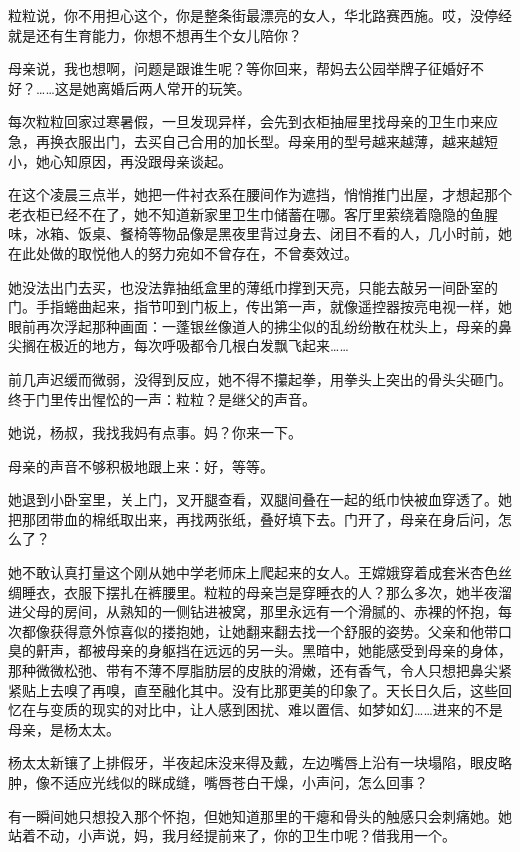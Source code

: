 \documentclass[lang=cn,newtx,12pt,scheme=chinese]{elegantbook}
\begin{document}
粒粒说，你不用担心这个，你是整条街最漂亮的女人，华北路赛西施。哎，没停经就是还有生育能力，你想不想再生个女儿陪你？

母亲说，我也想啊，问题是跟谁生呢？等你回来，帮妈去公园举牌子征婚好不好？……这是她离婚后两人常开的玩笑。

每次粒粒回家过寒暑假，一旦发现异样，会先到衣柜抽屉里找母亲的卫生巾来应急，再换衣服出门，去买自己合用的加长型。母亲用的型号越来越薄，越来越短小，她心知原因，再没跟母亲谈起。

在这个凌晨三点半，她把一件衬衣系在腰间作为遮挡，悄悄推门出屋，才想起那个老衣柜已经不在了，她不知道新家里卫生巾储蓄在哪。客厅里萦绕着隐隐的鱼腥味，冰箱、饭桌、餐椅等物品像是黑夜里背过身去、闭目不看的人，几小时前，她在此处做的取悦他人的努力宛如不曾存在，不曾奏效过。

她没法出门去买，也没法靠抽纸盒里的薄纸巾撑到天亮，只能去敲另一间卧室的门。手指蜷曲起来，指节叩到门板上，传出第一声，就像遥控器按亮电视一样，她眼前再次浮起那种画面：一蓬银丝像道人的拂尘似的乱纷纷散在枕头上，母亲的鼻尖搁在极近的地方，每次呼吸都令几根白发飘飞起来……

前几声迟缓而微弱，没得到反应，她不得不攥起拳，用拳头上突出的骨头尖砸门。终于门里传出惺忪的一声：粒粒？是继父的声音。

她说，杨叔，我找我妈有点事。妈？你来一下。

母亲的声音不够积极地跟上来：好，等等。

她退到小卧室里，关上门，叉开腿查看，双腿间叠在一起的纸巾快被血穿透了。她把那团带血的棉纸取出来，再找两张纸，叠好填下去。门开了，母亲在身后问，怎么了？

她不敢认真打量这个刚从她中学老师床上爬起来的女人。王嫦娥穿着成套米杏色丝绸睡衣，衣服下摆扎在裤腰里。粒粒的母亲岂是穿睡衣的人？那么多次，她半夜溜进父母的房间，从熟知的一侧钻进被窝，那里永远有一个滑腻的、赤裸的怀抱，每次都像获得意外惊喜似的搂抱她，让她翻来翻去找一个舒服的姿势。父亲和他带口臭的鼾声，都被母亲的身躯挡在远远的另一头。黑暗中，她能感受到母亲的身体，那种微微松弛、带有不薄不厚脂肪层的皮肤的滑嫩，还有香气，令人只想把鼻尖紧紧贴上去嗅了再嗅，直至融化其中。没有比那更美的印象了。天长日久后，这些回忆在与变质的现实的对比中，让人感到困扰、难以置信、如梦如幻……进来的不是母亲，是杨太太。

杨太太新镶了上排假牙，半夜起床没来得及戴，左边嘴唇上沿有一块塌陷，眼皮略肿，像不适应光线似的眯成缝，嘴唇苍白干燥，小声问，怎么回事？

有一瞬间她只想投入那个怀抱，但她知道那里的干瘪和骨头的触感只会刺痛她。她站着不动，小声说，妈，我月经提前来了，你的卫生巾呢？借我用一个。
\end{document}
